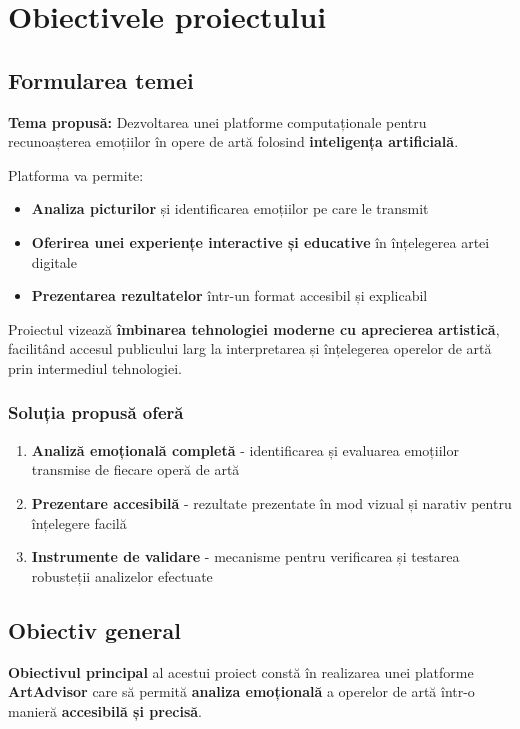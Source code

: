 \chapter{Obiectivele proiectului}
\label{ch:obiective}

\section{Formularea temei}
\label{sec:obiective-tema}

\textbf{Tema propusă:} Dezvoltarea unei platforme computaționale pentru recunoașterea emoțiilor în opere de artă folosind \textbf{inteligența artificială}. 

Platforma va permite:
\begin{itemize}
    \item \textbf{Analiza picturilor} și identificarea emoțiilor pe care le transmit
    \item \textbf{Oferirea unei experiențe interactive și educative} în înțelegerea artei digitale
    \item \textbf{Prezentarea rezultatelor} într-un format accesibil și explicabil
\end{itemize}

Proiectul vizează \textbf{îmbinarea tehnologiei moderne cu aprecierea artistică}, facilitând accesul publicului larg la interpretarea și înțelegerea operelor de artă prin intermediul tehnologiei.

\subsection*{Soluția propusă oferă}
\begin{enumerate}
  \item \textbf{Analiză emoțională completă} - identificarea și evaluarea emoțiilor transmise de fiecare operă de artă
  \item \textbf{Prezentare accesibilă} - rezultate prezentate în mod vizual și narativ pentru înțelegere facilă
  \item \textbf{Instrumente de validare} - mecanisme pentru verificarea și testarea robusteții analizelor efectuate
\end{enumerate}

\section{Obiectiv general}
\label{sec:obiectiv-general}

\textbf{Obiectivul principal} al acestui proiect constă în realizarea unei platforme \textbf{ArtAdvisor} care să permită \textbf{analiza emoțională} a operelor de artă într-o manieră \textbf{accesibilă și precisă}.

